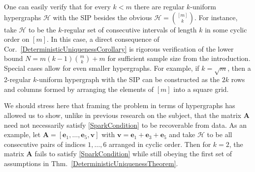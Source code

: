 \documentclass[journal, twocolumn]{IEEEtran}
\newtheorem{corollary}{Corollary}
\begin{document}


One can easily verify that for every $k < m$ there are regular $k$-uniform hypergraphs $\mathcal{H}$ with the SIP besides the obvious $\mathcal{H} = {[m] \choose k}$. For instance, take $\mathcal{H}$ to be the $k$-regular set of consecutive intervals of length $k$ in some cyclic order on $[m]$. In this case, a direct consequence of Cor.~\ref{DeterministicUniquenessCorollary} is rigorous verification of the lower bound \mbox{$N = m(k-1){m \choose k} + m$} for sufficient sample size from the introduction. Special cases allow for even smaller hypergraphs. For example, if $k = \sqrt{m}$, then a 2-regular $k$-uniform hypergraph with the SIP can be constructed as the $2k$ rows and columns formed by arranging the elements of $[m]$ into a square grid.

We should stress here that framing the problem in terms of hypergraphs has allowed us to show, unlike in previous research on the subject, that the matrix $\mathbf{A}$ need not necessarily satisfy \eqref{SparkCondition} to be recoverable from data. As an example, let $\mathbf{A} = [ \mathbf{e}_1, \ldots, \mathbf{e}_5, \mathbf{v}]$ with $\mathbf{v} = \mathbf{e}_1 + \mathbf{e}_3 + \mathbf{e}_5$ and take $\mathcal{H}$ to be all consecutive pairs of indices $1, \ldots ,6$ arranged in cyclic order. Then for $k=2$, the matrix $\mathbf{A}$ fails to satisfy \eqref{SparkCondition} while still obeying the first set of assumptions in Thm.~\ref{DeterministicUniquenessTheorem}.%
\end{document}
